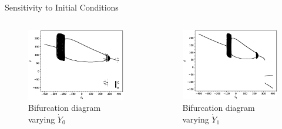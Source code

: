 \documentclass{beamer}
\begin{document}
\begin{frame}{Sensitivity to Initial Conditions}
	\begin{columns}
	\begin{column}{0.5\textwidth}
		\begin{figure}
			\centering
			\includegraphics[width=1.2\textwidth]{y0bifurcation.eps}
			\caption{Bifurcation diagram varying $\dot Y_0$}
		\end{figure}
	\end{column}
	\begin{column}{0.5\textwidth}
		\begin{figure}
			\centering
			\includegraphics[width=1.2\textwidth]{y1bifurcation.eps}
			\caption{Bifurcation diagram varying $\dot Y_1$}
		\end{figure}
	\end{column}
	\end{columns}
\end{frame}
\end{document}
